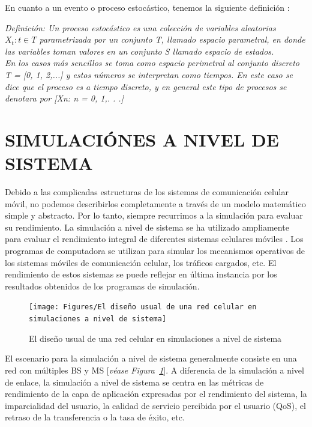En cuanto a un evento o proceso estocástico, tenemos la siguiente definición \parencite{Correia2018}:

\textit{
Definición: Un proceso estocástico es una colección de variables aleatorias $X_{t}:t\in T$ parametrizada por un conjunto T, llamado espacio parametral, en donde las variables toman valores en un conjunto S llamado espacio de estados.}\\
\textit{
En los casos más sencillos se toma como espacio perimetral al conjunto discreto\\}
\textit{
T = [0, 1, 2,...] y estos números se interpretan como tiempos. En este caso se dice que el proceso es a tiempo discreto, y en general este tipo de procesos se denotara  por [Xn: n = 0, 1,. . .]} 


\section{SIMULACIÓNES A NIVEL DE SISTEMA}

Debido a las complicadas estructuras de los sistemas de comunicación celular móvil, no podemos describirlos completamente a través de un modelo matemático simple y abstracto. Por lo tanto, siempre recurrimos a la simulación para evaluar su rendimiento. La simulación a nivel de sistema se ha utilizado ampliamente para evaluar el rendimiento integral de diferentes sistemas celulares móviles \parencite{Chen2011}. Los programas de computadora se utilizan para simular los mecanismos operativos de los sistemas móviles de comunicación celular, los tráficos cargados, etc. El rendimiento de estos sistemas se puede reflejar en última instancia por los resultados obtenidos de los programas de simulación.\newline

\begin{figure}[th]
\centering
\texttt{[image: Figures/El diseño usual de una red celular en simulaciones a nivel de sistema]}
\decoRule
\caption[El diseño usual de una red celular en simulaciones a nivel de sistema]{El diseño usual de una red celular en simulaciones a nivel de sistema}
\label{fig:sim_sistema}
\end{figure}

El escenario para la simulación a nivel de sistema generalmente consiste en una red con múltiples BS y MS [\textit{véase Figura~\ref{fig:sim_sistema}}]. A diferencia de la simulación a nivel de enlace, la simulación a nivel de sistema se centra en las métricas de rendimiento de la capa de aplicación expresadas por el rendimiento del sistema, la imparcialidad del usuario, la calidad de servicio percibida por el usuario (QoS), el retraso de la transferencia o la tasa de éxito, etc.

